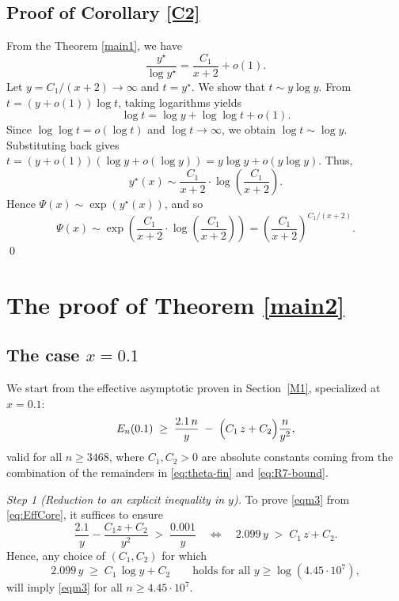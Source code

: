 \documentclass[10pt]{amsart}
\theoremstyle{definition} %
\numberwithin{equation}{section}
\begin{document}
\subsection{Proof of Corollary \ref{C2}}

From the Theorem \ref{main1}, we have
\[
\frac{y^{\star}}{\log y^{\star}} = \frac{C_1}{x+2} + o(1).
\]
Let $y = C_1/(x+2) \to \infty$ and $t = y^{\star}$. We show that $t \sim y \log y$.
From $t = (y + o(1)) \log t$, taking logarithms yields
\[
\log t = \log y + \log \log t + o(1).
\]
Since $\log \log t = o(\log t)$ and $\log t \to \infty$, we obtain $\log t \sim \log y$.
Substituting back gives $t = (y + o(1))(\log y + o(\log y)) = y \log y + o(y \log y)$.
Thus,
\[
y^{\star}(x) \sim \frac{C_1}{x+2} \cdot \log\left( \frac{C_1}{x+2} \right).
\]
Hence $\Psi(x) \sim \exp(y^{\star}(x))$, and so
\[
\Psi(x) \sim \exp\left(\frac{C_1}{x+2} \cdot \log\left(\frac{C_1}{x+2}\right)\right)  = \left( \frac{C_1}{x+2} \right)^{C_1/(x+2)}. 
\]
\qed

\section{The proof of Theorem \ref{main2}}\label{proof2}


\subsection{The case $x=0.1$}

We start from the effective
asymptotic proven in Section~\ref{M1}, specialized at $x=0.1$:
\begin{equation}\label{eq:EffCore}
E_n(0.1)
\;\ge\;
\frac{2.1\,n}{y}
\;-\;
\Bigl(C_1\,z + C_2\Bigr)\frac{n}{y^2},
\end{equation}
valid for all $n\ge 3468$, where $C_1,C_2>0$ are absolute constants
coming from the combination of the remainders in
\eqref{eq:theta-fin} and \eqref{eq:R7-bound}.


\medskip
\noindent\textit{Step 1 (Reduction to an explicit inequality in $y$).}
To prove \eqref{eqm3} from \eqref{eq:EffCore}, it suffices to ensure
\[
\frac{2.1}{y}-\frac{C_1 z + C_2}{y^2}\;>\;\frac{0.001}{y}
\quad\Longleftrightarrow\quad
2.099\,y\;>\;C_1\,z + C_2.
\]
Hence, any choice of $(C_1,C_2)$ for which
\begin{equation}\label{eq:goal-ineq}
2.099\,y \;\ge\; C_1\,\log y + C_2
\qquad\text{holds for all }y\ge \log(4.45\cdot 10^{7}),
\end{equation}
will imply \eqref{eqm3} for all $n\ge 4.45\cdot 10^{7}$.
\end{document}
